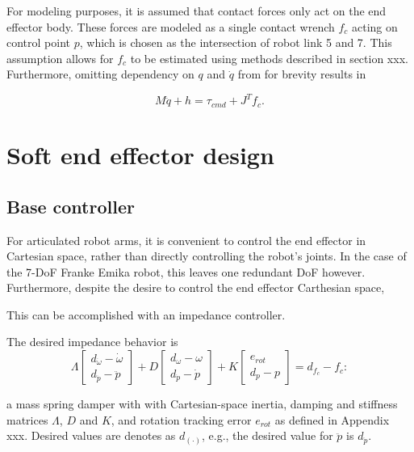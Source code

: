 \documentclass[a4paper, 10pt, conference]{ieeeconf}
\begin{document}
    For modeling purposes, it is assumed that contact forces only act on the end effector body. These forces are modeled as a single contact wrench $f_c$ acting on control point $p$, which is chosen as the intersection of robot link 5 and 7. This assumption allows for $f_c$ to be estimated using methods described in section xxx. Furthermore, omitting dependency on $q$ and $\dot{q}$ from for brevity results in

    \begin{equation}
    M\ddot{q}+h=\tau_{cmd}+J^Tf_c.
    \end{equation}

    \section{Soft end effector design}

    \subsection{Base controller}
    For articulated robot arms, it is convenient to control the end effector in Cartesian space, rather than directly controlling the robot's joints. In the case of the 7-DoF Franke Emika robot, this leaves one redundant DoF however. Furthermore, despite the desire to control the end effector Carthesian space, 


    This can be accomplished with an impedance controller.

    The desired impedance behavior is
    \begin{equation} \label{eq:impedance_desired}
     \Lambda  \begin{bmatrix} d_{\dot{\omega}} - \dot{\omega}   \\ d_{\ddot{p}} - \ddot{p}  \end{bmatrix} + D \begin{bmatrix}d_\omega - {\omega} \\ d_{\dot{p}} - \dot{p} \end{bmatrix}  + K \begin{bmatrix} e_{rot} \\d_p - {p}  \end{bmatrix} = d_{f_c} -f_c:
     \end{equation} 

    a mass spring damper with with Cartesian-space inertia, damping and stiffness matrices $\Lambda$, $D$ and $K$, and rotation tracking error $e_{rot}$ as defined in Appendix xxx. Desired values are denotes as $d_{(\cdot)}$, e.g., the desired value for $\ddot{p}$ is  $d_{\ddot{p}}$.
\end{document}
